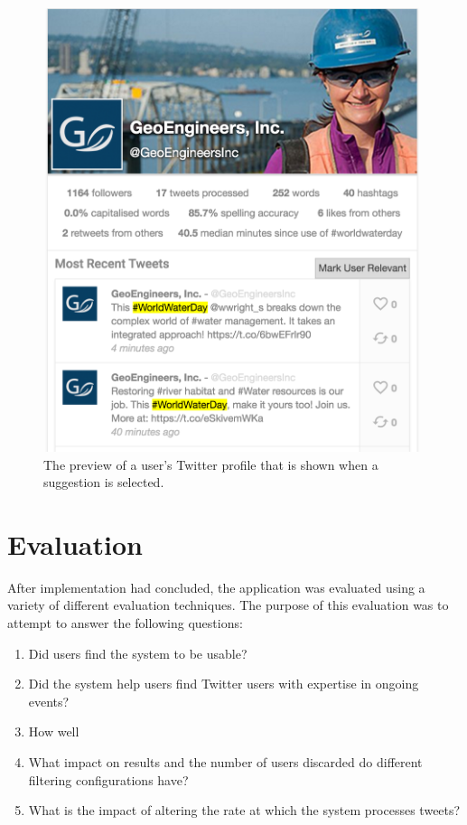 \documentclass{l4proj}
\begin{document}
\begin{figure}
\centering
\includegraphics[scale=0.5]{userpreview.png}
\caption{The preview of a user's Twitter profile that is shown when a suggestion is selected.}
\label{userpreview}
\end{figure}         
        
        
\chapter{Evaluation}

After implementation had concluded, the application was evaluated using a variety of different evaluation techniques. The purpose of this evaluation was to attempt to answer the following questions:

\begin{enumerate}
\item Did users find the system to be usable?
\item Did the system help users find Twitter users with expertise in ongoing events?
\item How well 
\item What impact on results and the number of users discarded do different filtering configurations have?
\item What is the impact of altering the rate at which the system processes tweets?
\end{enumerate}
\end{document}
